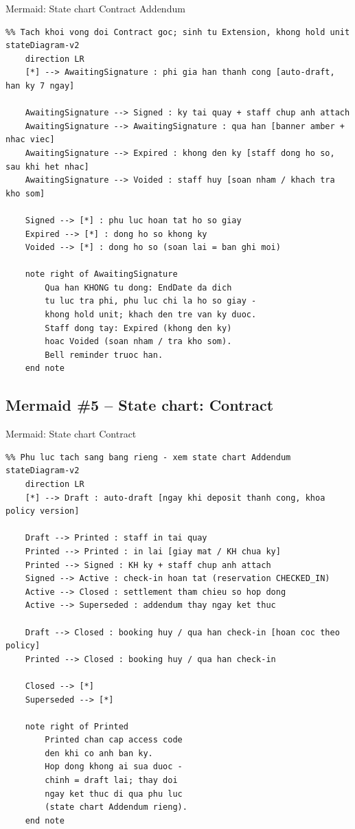 \documentclass[12pt,a4paper]{article}
\renewcommand{\_}{\textunderscore\allowbreak}
\begin{document}
\begin{mermaidbox}{Mermaid: State chart Contract Addendum}
\begin{Verbatim}[fontsize=\small]
%% StorageHub - State chart: vong doi Contract Addendum (CT-...-A1) - V3 2026-09-18
%% Tach khoi vong doi Contract goc; sinh tu Extension, khong hold unit
stateDiagram-v2
    direction LR
    [*] --> AwaitingSignature : phi gia han thanh cong [auto-draft, han ky 7 ngay]

    AwaitingSignature --> Signed : ky tai quay + staff chup anh attach
    AwaitingSignature --> AwaitingSignature : qua han [banner amber + nhac viec]
    AwaitingSignature --> Expired : khong den ky [staff dong ho so, sau khi het nhac]
    AwaitingSignature --> Voided : staff huy [soan nham / khach tra kho som]

    Signed --> [*] : phu luc hoan tat ho so giay
    Expired --> [*] : dong ho so khong ky
    Voided --> [*] : dong ho so (soan lai = ban ghi moi)

    note right of AwaitingSignature
        Qua han KHONG tu dong: EndDate da dich
        tu luc tra phi, phu luc chi la ho so giay -
        khong hold unit; khach den tre van ky duoc.
        Staff dong tay: Expired (khong den ky)
        hoac Voided (soan nham / tra kho som).
        Bell reminder truoc han.
    end note
\end{Verbatim}
\end{mermaidbox}

\subsection{Mermaid \#5 -- State chart: Contract}

\begin{mermaidbox}{Mermaid: State chart Contract}
\begin{Verbatim}[fontsize=\small]
%% StorageHub - State chart: vong doi Contract goc (CT-) - V3 2026-09-18
%% Phu luc tach sang bang rieng - xem state chart Addendum
stateDiagram-v2
    direction LR
    [*] --> Draft : auto-draft [ngay khi deposit thanh cong, khoa policy version]

    Draft --> Printed : staff in tai quay
    Printed --> Printed : in lai [giay mat / KH chua ky]
    Printed --> Signed : KH ky + staff chup anh attach
    Signed --> Active : check-in hoan tat (reservation CHECKED_IN)
    Active --> Closed : settlement tham chieu so hop dong
    Active --> Superseded : addendum thay ngay ket thuc

    Draft --> Closed : booking huy / qua han check-in [hoan coc theo policy]
    Printed --> Closed : booking huy / qua han check-in

    Closed --> [*]
    Superseded --> [*]

    note right of Printed
        Printed chan cap access code
        den khi co anh ban ky.
        Hop dong khong ai sua duoc -
        chinh = draft lai; thay doi
        ngay ket thuc di qua phu luc
        (state chart Addendum rieng).
    end note
\end{Verbatim}
\end{mermaidbox}
\end{document}
